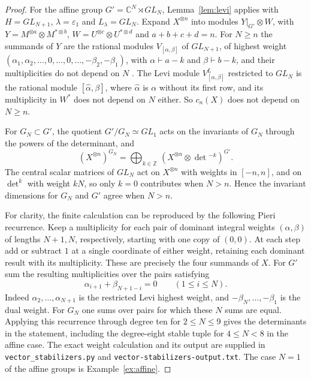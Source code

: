 \documentclass[11pt,reqno]{amsart}
\theoremstyle{definition}
\newcommand{\CC}{\mathbb C}
\newcommand{\ZZ}{\mathbb Z}
\begin{document}
\begin{proof}
For the affine group $G'=\CC^N\rtimes GL_N$, Lemma~\ref{lem:levi} applies with $H=GL_{N+1}$, $\lambda=\varepsilon_1$ and $L_\lambda=GL_N$. Expand $X^{\otimes n}$ into modules $Y|_{G'}\otimes W$, with $Y=M^{\otimes a}\otimes M^{*\otimes b}$, $W=U^{\otimes c}\otimes U^{*\otimes d}$ and $a+b+c+d=n$. For $N\geq n$ the summands of $Y$ are the rational modules $V_{[\alpha,\beta]}$ of $GL_{N+1}$, of highest weight $(\alpha_1,\alpha_2,\ldots,0,\ldots,0,\ldots,-\beta_2,-\beta_1)$, with $\alpha\vdash a-k$ and $\beta\vdash b-k$, and their multiplicities do not depend on $N$ \cite{Koike}. The Levi module $V^L_{[\alpha,\beta]}$ restricted to $GL_N$ is the rational module $[\hat\alpha,\beta]$, where $\hat\alpha$ is $\alpha$ without its first row, and its multiplicity in $W^*$ does not depend on $N$ either. So $c_n(X)$ does not depend on $N\geq n$.

For $G_N\subset G'$, the quotient $G'/G_N\simeq GL_1$ acts on the invariants of $G_N$ through the powers of the determinant, and
\[
   (X^{\otimes n})^{G_N}=\bigoplus_{k\in\ZZ}\,(X^{\otimes n}\otimes\det{}^{-k})^{G'} .
\]
The central scalar matrices of $GL_N$ act on $X^{\otimes n}$ with weights in $[-n,n]$, and on $\det^k$ with weight $kN$, so only $k=0$ contributes when $N>n$. Hence the invariant dimensions for $G_N$ and $G'$ agree when $N>n$.

For clarity, the finite calculation can be reproduced by the following Pieri recurrence. Keep a multiplicity for each pair of dominant integral weights $(\alpha,\beta)$ of lengths $N+1,N$, respectively, starting with one copy of $(0,0)$. At each step add or subtract $1$ at a single coordinate of either weight, retaining each dominant result with its multiplicity. These are precisely the four summands of $X$. For $G'$ sum the resulting multiplicities over the pairs satisfying
\[
       \alpha_{i+1}+\beta_{N+1-i}=0\qquad(1\le i\le N).
\]
Indeed $\alpha_2,\ldots,\alpha_{N+1}$ is the restricted Levi highest weight, and $-\beta_N,\ldots,-\beta_1$ is the dual weight. For $G_N$ one sums over pairs for which these $N$ sums are equal. Applying this recurrence through degree ten for $2\le N\le9$ gives the determinants in the statement, including the degree-eight stable tuple for $4\le N<8$ in the affine case. The exact weight calculation and its output are supplied in \texttt{vector\_stabilizers.py} and \texttt{vector-stabilizers-output.txt}. The case $N=1$ of the affine groups is Example~\ref{ex:affine}.
\end{proof}
\end{document}
